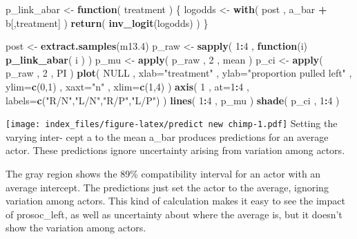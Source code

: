 \documentclass[
]{article}
\newenvironment{Shaded}{\begin{snugshade}}{\end{snugshade}}
\newcommand{\ControlFlowTok}[1]{\textcolor[rgb]{0.13,0.29,0.53}{\textbf{#1}}}
\newcommand{\DataTypeTok}[1]{\textcolor[rgb]{0.13,0.29,0.53}{#1}}
\newcommand{\DecValTok}[1]{\textcolor[rgb]{0.00,0.00,0.81}{#1}}
\newcommand{\FloatTok}[1]{\textcolor[rgb]{0.00,0.00,0.81}{#1}}
\newcommand{\KeywordTok}[1]{\textcolor[rgb]{0.13,0.29,0.53}{\textbf{#1}}}
\newcommand{\NormalTok}[1]{#1}
\newcommand{\OperatorTok}[1]{\textcolor[rgb]{0.81,0.36,0.00}{\textbf{#1}}}
\newcommand{\OtherTok}[1]{\textcolor[rgb]{0.56,0.35,0.01}{#1}}
\newcommand{\StringTok}[1]{\textcolor[rgb]{0.31,0.60,0.02}{#1}}
\begin{document}
\begin{Shaded}
\begin{Highlighting}[]
\NormalTok{p_link_abar <-}\StringTok{ }\ControlFlowTok{function}\NormalTok{( treatment ) \{}
\NormalTok{logodds <-}\StringTok{ }\KeywordTok{with}\NormalTok{( post , a_bar }\OperatorTok{+}\StringTok{ }\NormalTok{b[,treatment] ) }
\KeywordTok{return}\NormalTok{( }\KeywordTok{inv_logit}\NormalTok{(logodds) )}
\NormalTok{\}}

\NormalTok{post <-}\StringTok{ }\KeywordTok{extract.samples}\NormalTok{(m13}\FloatTok{.4}\NormalTok{)}
\NormalTok{p_raw <-}\StringTok{ }\KeywordTok{sapply}\NormalTok{( }\DecValTok{1}\OperatorTok{:}\DecValTok{4}\NormalTok{ , }\ControlFlowTok{function}\NormalTok{(i) }\KeywordTok{p_link_abar}\NormalTok{( i ) ) }
\NormalTok{p_mu <-}\StringTok{ }\KeywordTok{apply}\NormalTok{( p_raw , }\DecValTok{2}\NormalTok{ , mean )}
\NormalTok{p_ci <-}\StringTok{ }\KeywordTok{apply}\NormalTok{( p_raw , }\DecValTok{2}\NormalTok{ , PI )}
\KeywordTok{plot}\NormalTok{( }\OtherTok{NULL}\NormalTok{ , }\DataTypeTok{xlab=}\StringTok{"treatment"}\NormalTok{ , }\DataTypeTok{ylab=}\StringTok{"proportion pulled left"}\NormalTok{ ,}
    \DataTypeTok{ylim=}\KeywordTok{c}\NormalTok{(}\DecValTok{0}\NormalTok{,}\DecValTok{1}\NormalTok{) , }\DataTypeTok{xaxt=}\StringTok{"n"}\NormalTok{ , }\DataTypeTok{xlim=}\KeywordTok{c}\NormalTok{(}\DecValTok{1}\NormalTok{,}\DecValTok{4}\NormalTok{) )}
\KeywordTok{axis}\NormalTok{( }\DecValTok{1}\NormalTok{ , }\DataTypeTok{at=}\DecValTok{1}\OperatorTok{:}\DecValTok{4}\NormalTok{ , }\DataTypeTok{labels=}\KeywordTok{c}\NormalTok{(}\StringTok{"R/N"}\NormalTok{,}\StringTok{"L/N"}\NormalTok{,}\StringTok{"R/P"}\NormalTok{,}\StringTok{"L/P"}\NormalTok{) )}
\KeywordTok{lines}\NormalTok{( }\DecValTok{1}\OperatorTok{:}\DecValTok{4}\NormalTok{ , p_mu )}
\KeywordTok{shade}\NormalTok{( p_ci , }\DecValTok{1}\OperatorTok{:}\DecValTok{4}\NormalTok{ )}
\end{Highlighting}
\end{Shaded}

\texttt{[image: index\_files/figure-latex/predict new chimp-1.pdf]}
Setting the varying inter- cept a to the mean a\_bar produces
predictions for an average actor. These predictions ignore uncertainty
arising from variation among actors.

The gray region shows the 89\% compatibility interval for an actor with
an average intercept. The predictions just set the actor to the average,
ignoring variation among actors. This kind of calculation makes it easy
to see the impact of prosoc\_left, as well as uncertainty about where
the average is, but it doesn't show the variation among actors.
\end{document}
